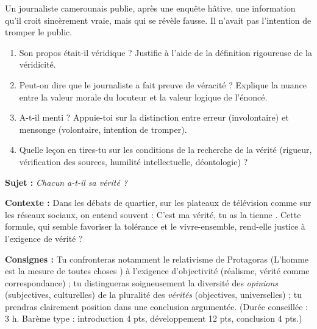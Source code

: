 \documentclass[11pt]{article}
\newcommand{\cle}[1]{{\popxbold\color{popdark}#1}}
\newcounter{popsec}
\newcounter{popsub}
\newcommand{\courssub}[1]{%
  \stepcounter{popsub}%
  \par\vspace{9pt}\noindent{\popxbold\fontsize{11.5}{13}\selectfont\color{popink}{\color{poporange}\thepopsec.\thepopsub}\hspace{6pt}#1}\par\nopagebreak\vspace{4pt}
}
\begin{document}
\begin{exercice}
Un journaliste camerounais publie, après une enquête hâtive, une information qu'il croit sincèrement vraie, mais qui se révèle fausse. Il n'avait pas l'intention de tromper le public.
\begin{enumerate}
\item Son propos était-il \cle{véridique} ? Justifie à l'aide de la définition rigoureuse de la véridicité.
\item Peut-on dire que le journaliste a fait preuve de \cle{véracité} ? Explique la nuance entre la valeur morale du locuteur et la valeur logique de l'énoncé.
\item A-t-il menti ? Appuie-toi sur la distinction entre erreur (involontaire) et mensonge (volontaire, intention de tromper).
\item Quelle leçon en tires-tu sur les conditions de la recherche de la vérité (rigueur, vérification des sources, humilité intellectuelle, déontologie) ?
\end{enumerate}
\end{exercice}

\courssub{Je me prépare au Bac}

\begin{exercice}
\textbf{Sujet :} \emph{Chacun a-t-il sa vérité ?}

\textbf{Contexte :} Dans les débats de quartier, sur les plateaux de télévision comme sur les réseaux sociaux, on entend souvent : \guillemotleft C'est ma vérité, tu as la tienne \guillemotright. Cette formule, qui semble favoriser la tolérance et le vivre-ensemble, rend-elle justice à l'exigence de vérité ?

\textbf{Consignes :} Tu confronteras notamment le relativisme de Protagoras (\guillemotleft L'homme est la mesure de toutes choses \guillemotright) à l'exigence d'objectivité (réalisme, vérité comme correspondance) ; tu distingueras soigneusement la diversité des \emph{opinions} (subjectives, culturelles) de la pluralité des \emph{vérités} (objectives, universelles) ; tu prendras clairement position dans une conclusion argumentée. (Durée conseillée : 3 h. Barème type : introduction 4 pts, développement 12 pts, conclusion 4 pts.)
\end{exercice}
\end{document}
